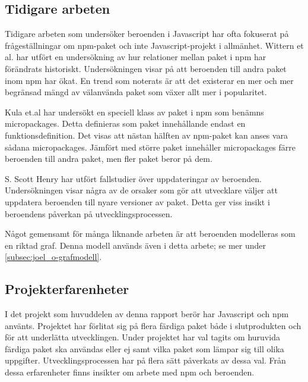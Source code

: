 \subsection{Tidigare arbeten}
Tidigare arbeten som undersöker beroenden i Javascript har ofta fokuserat på frågeställningar om npm-paket och inte Javascript-projekt i allmänhet. Wittern et al. har utfört en undersökning av hur relationer mellan paket i npm har förändrats historiskt.\cite{Wittern:2016} Undersökningen visar på att beroenden till andra paket inom npm har ökat. En trend som noterats är att det existerar en mer och mer begränsad mängd av välanvända paket som växer allt mer i popularitet.

Kula et.al har undersökt en speciell klass av paket i npm som benämns micropackages.\cite{Kula2017} Detta definieras som paket innehållande endast en funktionsdefinition. Det visas att nästan hälften av npm-paket kan anses vara sådana micropackages. Jämfört med större paket innehåller micropackages färre beroenden till andra paket, men fler paket beror på dem.

S. Scott Henry har utfört fallstudier över uppdateringar av beroenden.\cite{Henry2017} Undersökningen visar några av de orsaker som gör att utvecklare väljer att uppdatera beroenden till nyare versioner av paket. Detta ger viss insikt i beroendens påverkan på utvecklingsprocessen.

Något gemensamt för många liknande arbeten är att beroenden modelleras som en riktad graf. Denna modell används även i detta arbete; se mer under \ref{subsec:joel_o-grafmodell}.

\subsection{Projekterfarenheter}
I det projekt som huvuddelen av denna rapport berör har Javascript och npm använts. Projektet har förlitat sig på flera färdiga paket både i slutprodukten och för att underlätta utvecklingen. Under projektet har val tagits om huruvida färdiga paket ska användas eller ej samt vilka paket som lämpar sig till olika uppgifter. Utvecklingsprocessen har på flera sätt påverkats av dessa val. Från dessa erfarenheter finns insikter om arbete med npm och beroenden.
